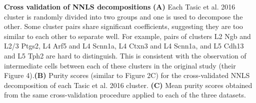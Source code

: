 \textbf{Cross validation of NNLS decompositions}
\textbf{(A)} Each Tasic et al. 2016 cluster is randomly divided into two groups and one is used to decompose the other. Some cluster pairs share significant coefficients, suggesting they are too similar to each other to separate well. For example, pairs of clusters L2 Ngb and L2/3 Ptgs2, L4 Arf5 and L4 Scnn1a, L4 Ctxn3 and L4 Scnn1a, and L5 Cdh13 and L5 Tph2 are hard to distinguish. This is consistent with the observation of intermediate cells between each of these clusters in the original study (their Figure 4).\textbf{(B)} Purity scores (similar to Figure 2C) for the cross-validated NNLS decomposition of each Tasic et al. 2016 cluster. \textbf{(C)} Mean purity scores obtained from the same cross-validation procedure applied to each of the three datasets. 